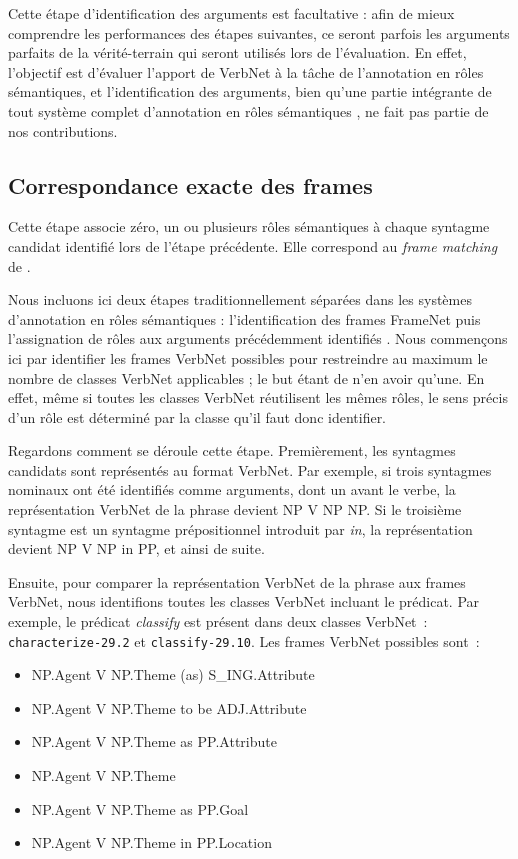 Cette étape d'identification des arguments est facultative : afin de mieux
comprendre les performances des étapes suivantes, ce seront parfois les
arguments parfaits de la vérité-terrain qui seront utilisés lors de
l'évaluation. En effet, l'objectif est d'évaluer l'apport de VerbNet à la tâche
de l'annotation en rôles sémantiques, et l'identification des arguments, bien
qu'une partie intégrante de tout système complet d'annotation en rôles
sémantiques \citep{das2010probabilistic}, ne fait pas partie de nos
contributions.

\subsection{Correspondance exacte des frames}

Cette étape associe zéro, un ou plusieurs rôles sémantiques à chaque syntagme
candidat identifié lors de l'étape précédente. Elle correspond au \emph{frame
matching} de \citet{swier2005exploiting}.

Nous incluons ici deux étapes traditionnellement séparées dans les systèmes
d'annotation en rôles sémantiques : l'identification des frames FrameNet puis
l'assignation de rôles aux arguments précédemment identifiés
\citep{gildea2002automatic,das2014frame}. Nous commençons ici par identifier
les frames VerbNet possibles pour restreindre au maximum le nombre de classes
VerbNet applicables ; le but étant de n'en avoir qu'une. En effet, même si
toutes les classes VerbNet réutilisent les mêmes rôles, le sens précis d'un
rôle est déterminé par la classe qu'il faut donc identifier.

Regardons comment se déroule cette étape. Premièrement, les syntagmes candidats
sont représentés au format VerbNet. Par exemple, si trois syntagmes nominaux
ont été identifiés comme arguments, dont un avant le verbe, la représentation
VerbNet de la phrase devient NP V NP NP. Si le troisième syntagme est un
syntagme prépositionnel introduit par \emph{in}, la représentation devient NP
V NP in PP, et ainsi de suite.

Ensuite, pour comparer la représentation VerbNet de la phrase aux frames
VerbNet, nous identifions toutes les classes VerbNet incluant le prédicat. Par
exemple, le prédicat \emph{classify} est présent dans deux classes VerbNet~:
\texttt{characterize-29.2} et \texttt{classify-29.10}. Les frames VerbNet
possibles sont~:

\begin{itemize}
    \item NP.Agent V NP.Theme (as) S\_ING.Attribute
    \item NP.Agent V NP.Theme to be ADJ.Attribute
    \item NP.Agent V NP.Theme as PP.Attribute
    \item NP.Agent V NP.Theme
    \item NP.Agent V NP.Theme as PP.Goal
    \item NP.Agent V NP.Theme in PP.Location
\end{itemize}

